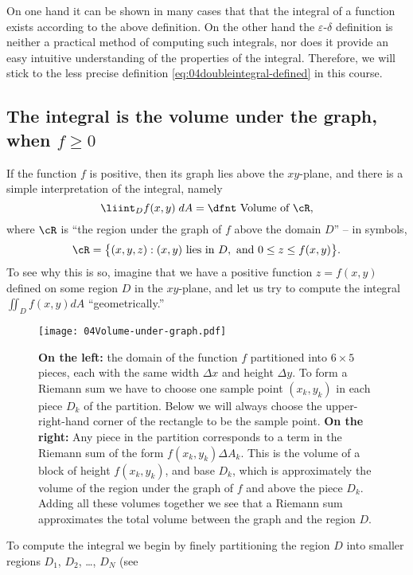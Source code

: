 On one hand it can be shown in many cases that that the integral of a function
exists according to the above definition.  On the other hand the
$\varepsilon$-$\delta$ definition is neither a practical method of computing
such integrals, nor does it provide an easy intuitive understanding of the
properties of the integral.  Therefore, we will stick to the less precise
definition \eqref{eq:04doubleintegral-defined} in this course.

\subsection{The integral is the volume under the graph, when $f\ge 0$}
If the function $f$ is positive, then its graph lies above the $xy$-plane, and
there is a simple interpretation of the integral, namely
\[
\liint_{D} f(x, y)\; dA  = \text{\dfnt Volume of }\cR,
\]
where $\cR$ is ``the region under the graph of $f$ above the domain $D$'' -- in
symbols,
\begin{equation}
  \cR = \bigl\{(x, y, z) : (x,y)\text{ lies in }D,\text{ and }
  0\leq z\leq f(x, y)\bigr\}.
  \label{eq:04region-under-graph}
\end{equation}
To see why this is so, imagine that we have a positive function $z=f(x, y)$
defined on some region $D$ in the $xy$-plane, and let us try to compute the
integral $\iint_D f(x, y) dA$ ``geometrically.''
\begin{figure}[t]
  \centering
  \texttt{[image: 04Volume-under-graph.pdf]}
  \caption{%
    \textbf{On the left: } the domain of the function $f$ partitioned into
    $6\times5$ pieces, each with the same width $\Delta x$ and height $\Delta
    y$.  To form a Riemann sum we have to choose one sample point $(x_k, y_k)$
    in each piece $D_k$ of the partition.  Below we will always choose the
    upper-right-hand corner of the rectangle to be the sample point.  \textbf{On
      the right:} Any piece in the partition corresponds to a term in the
    Riemann sum of the form $f(x_k, y_k)\Delta A_k$. This is the volume of a
    block of height $f(x_k, y_k)$, and base $D_k$, which is approximately the
    volume of the region under the graph of $f$ and above the piece $D_k$.
    Adding all these volumes together we see that a Riemann sum approximates
    the total volume between the graph and the region $D$.}
  \label{fig:04Volume-under-graph}
\end{figure}%
To compute the integral we begin by finely partitioning the region $D$ into
smaller regions $D_1$, $D_2$, \dots, $D_N$ (see
